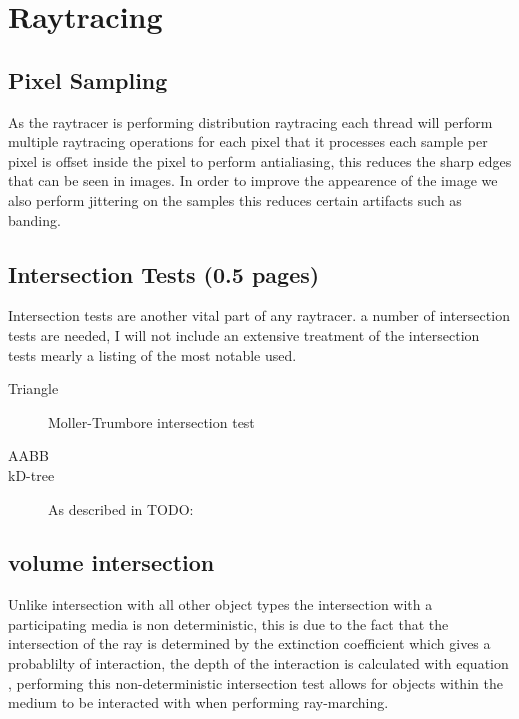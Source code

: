 \section{Raytracing}
\subsection{Pixel Sampling}
As the raytracer is performing distribution raytracing each thread will perform multiple raytracing operations for each pixel
that it processes each sample per pixel is offset inside the pixel to perform antialiasing, this reduces the sharp edges that
can be seen in images. In order to improve the appearence of the image we also perform jittering on the samples this reduces
certain artifacts such as banding. 


\subsection{Intersection Tests (0.5 pages)}
Intersection tests are another vital part of any raytracer. a number of intersection tests are needed, I will not include
an extensive treatment of the intersection tests mearly a listing of the most notable used.

\begin{description}
\item[Triangle] Moller-Trumbore intersection test \cite{MolTru97}
\item[AABB]
\item[kD-tree] As described in TODO:
\end{description}

\subsection{volume intersection}
Unlike intersection with all other object types the intersection with a participating media is non deterministic, this is
due to the fact that the intersection of the ray is determined by the extinction coefficient which gives a probablilty
of interaction, the depth of the interaction is calculated with equation , performing this non-deterministic
intersection test allows for objects within the medium to be interacted with when performing ray-marching.


